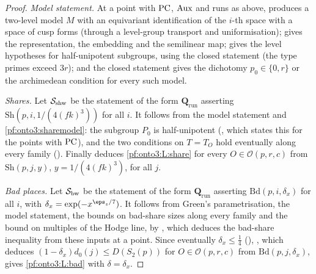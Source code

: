 \begin{proof}
\emph{Model statement.} At a point with $\mathrm{PC}$, $\mathrm{Aux}$ and runs as above,
 produces a two-level model $M$ with an equivariant identification
of the $i$-th space with a space of cusp forms (through a level-group transport and uniformisation);
 gives the representation, the embedding and the
semilinear map;  gives the level
hypotheses for half-unipotent subgroups, using the closed statement
 (the type primes exceed $3r$); and the closed statement
 gives the dichotomy $p_0\in\{0,r\}$ or the
archimedean condition for every such model.

\emph{Shares.} Let $\mathcal{S}_{\mathrm{shw}}$ be the statement of the form $\mathbf Q_{\mathrm{run}}$ asserting
$\mathrm{Sh}(p,i,1/(4(fk)^3))$ for all $i$. It follows from the model statement and \cref{pf:onto3:sharemodel}: the
subgroup $P_0$ is half-unipotent (, which states this
for the points with $\mathrm{PC}$), and the two conditions on $T=T_O$ hold eventually along every family
(). Finally
 deduces \ref{pf:onto3:L:share} for every
$O\in\mathcal O(p,r,c)$ from $\mathrm{Sh}(p,j,y)$, $y=1/(4(fk)^3)$, for all $j$.

\emph{Bad places.} Let $\mathcal{S}_{\mathrm{bw}}$ be the statement of the form $\mathbf Q_{\mathrm{run}}$ asserting
$\mathrm{Bd}(p,i,\delta_x)$ for all $i$, with $\delta_x=\exp(-x^{\eps_z/7})$. It follows from Green's
parametrisation, the model statement, the bounds  on
bad-share sizes along every family and the bound 
on multiples of the Hodge line, by , which deduces the
bad-share inequality from these inputs at a point. Since eventually $\delta_x\le\frac14$
(), , which
deduces $(1-\delta_x)d_0(j)\le D(S_2(p))$ for $O\in\mathcal O(p,r,c)$ from $\mathrm{Bd}(p,j,\delta_x)$, gives
\ref{pf:onto3:L:bad} with $\delta=\delta_x$.
\end{proof}

